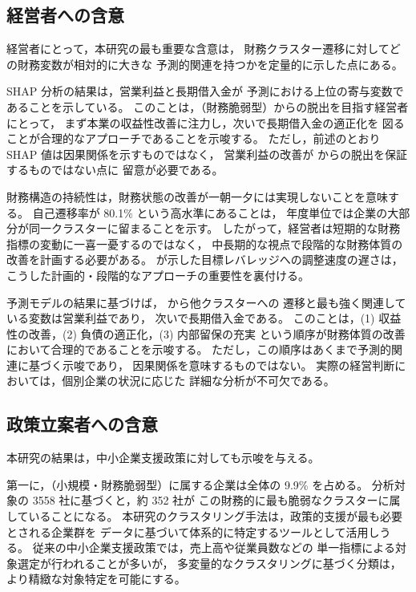 \subsection{経営者への含意}

経営者にとって，本研究の最も重要な含意は，
財務クラスター遷移に対してどの財務変数が相対的に大きな
予測的関連を持つかを定量的に示した点にある。

SHAP 分析の結果は，営業利益と長期借入金が
予測における上位の寄与変数であることを示している。
このことは，（財務脆弱型）からの脱出を目指す経営者にとって，
まず本業の収益性改善に注力し，次いで長期借入金の適正化を
図ることが合理的なアプローチであることを示唆する。
ただし，前述のとおり SHAP 値は因果関係を示すものではなく，
営業利益の改善が  からの脱出を保証するものではない点に
留意が必要である。

財務構造の持続性は，財務状態の改善が一朝一夕には実現しないことを意味する。
自己遷移率が 80.1\% という高水準にあることは，
年度単位では企業の大部分が同一クラスターに留まることを示す。
したがって，経営者は短期的な財務指標の変動に一喜一憂するのではなく，
中長期的な視点で段階的な財務体質の改善を計画する必要がある。
 が示した目標レバレッジへの調整速度の遅さは，
こうした計画的・段階的なアプローチの重要性を裏付ける。

予測モデルの結果に基づけば， から他クラスターへの
遷移と最も強く関連している変数は営業利益であり，
次いで長期借入金である。
このことは，(1) 収益性の改善，(2) 負債の適正化，(3) 内部留保の充実
という順序が財務体質の改善において合理的であることを示唆する。
ただし，この順序はあくまで予測的関連に基づく示唆であり，
因果関係を意味するものではない。
実際の経営判断においては，個別企業の状況に応じた
詳細な分析が不可欠である。

\subsection{政策立案者への含意}

本研究の結果は，中小企業支援政策に対しても示唆を与える。

第一に，（小規模・財務脆弱型）に属する企業は全体の 9.9\% を占める。
分析対象の \num{3558} 社に基づくと，約 352 社が
この財務的に最も脆弱なクラスターに属していることになる。
本研究のクラスタリング手法は，政策的支援が最も必要とされる企業群を
データに基づいて体系的に特定するツールとして活用しうる。
従来の中小企業支援政策では，売上高や従業員数などの
単一指標による対象選定が行われることが多いが，
多変量的なクラスタリングに基づく分類は，
より精緻な対象特定を可能にする。

